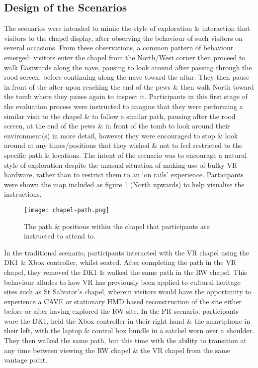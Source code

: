 
\subsection{Design of the Scenarios}

The scenarios were intended to mimic the style of exploration \& interaction that visitors to the chapel display, after observing the behaviour of such visitors on several occasions. From these observations, a common pattern of behaviour emerged: visitors enter the chapel from the North/West corner then proceed to walk Eastwards along the nave, pausing to look around after passing through the rood screen, before continuing along the nave toward the altar. They then pause in front of the alter upon reaching the end of the pews \& then walk North toward the tomb where they pause again to inspect it. Participants in this first stage of the evaluation process were instructed to imagine that they were performing a similar visit to the chapel \& to follow a similar path, pausing after the rood screen, at the end of the pews \& in front of the tomb to look around their environment(s) in more detail, however they were encouraged to stop \& look around at any times/positions that they wished \& not to feel restricted to the specific path \& locations. The intent of the scenario was to encourage a natural style of exploration despite the unusual situation of making use of bulky VR hardware, rather than to restrict them to an `on rails' experience. Participants were shown the map included as figure \ref{chapel-path} (North upwards) to help visualise the instructions.

\begin{figure}[h]
	\begin{center}
		\texttt{[image: chapel-path.png]}
		\caption{The path \& positions within the chapel that participants are instructed to attend to.}
		\label{chapel-path}
	\end{center}
\end{figure}

In the traditional scenario, participants interacted with the VR chapel using the DK1 \& Xbox controller, whilst seated. After completing the path in the VR chapel, they removed the DK1 \& walked the same path in the RW chapel. This behaviour alludes to how VR has previously been applied to cultural heritage sites such as St Salvator's chapel, wherein visitors would have the opportunity to experience a CAVE or stationary HMD based reconstruction of the site either before or after having explored the RW site. In the PR scenario, participants wore the DK1, held the Xbox controller in their right hand \& the smartphone in their left, with the laptop \& control box bundle in a satchel worn over a shoulder. They then walked the same path, but this time with the ability to transition at any time between viewing the RW chapel \& the VR chapel from the same vantage point.

